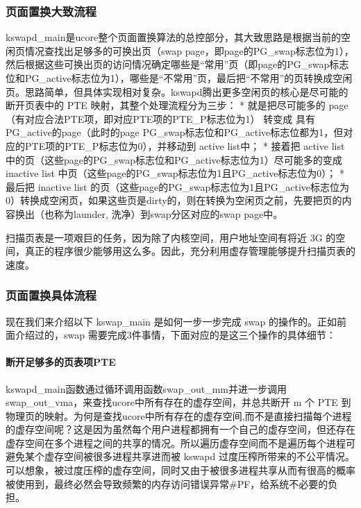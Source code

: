 \subsubsection{页面置换大致流程}\label{ux9875ux9762ux7f6eux6362ux5927ux81f4ux6d41ux7a0b}

kswapd\_main是ucore整个页面置换算法的总控部分，其大致思路是根据当前的空闲页情况查找出足够多的可换出页（swap
page，即page的PG\_swap标志位为1），然后根据这些可换出页的访问情况确定哪些是``常用''页（即page的PG\_swap标志位和PG\_active标志位为1），哪些是``不常用''页，最后把``不常用''的页转换成空闲页。思路简单，但具体实现相对复杂。kswapd腾出更多空闲页的核心是尽可能的断开页表中的
PTE 映射，其整个处理流程分为三步： * 就是把尽可能多的
page（有对应合法PTE项，即对应PTE项的PTE\_P标志位为1） 转变成
具有PG\_active的page（此时的page
PG\_swap标志位和PG\_active标志位都为1，但对应的PTE项的PTE\_P标志位为0），并移动到
active list中； * 接着把 active list
中的页（这些page的PG\_swap标志位和PG\_active标志位为1）尽可能多的变成
inactive list 中页（这些page的PG\_swap标志位为1且PG\_active标志位为0）；
* 最后把 inactive list
的页（这些page的PG\_swap标志位为1且PG\_active标志位为0）转换成空闲页，如果这些页是dirty的，则在转换为空闲页之前，先要把页的内容换出（也称为launder,
洗净）到swap分区对应的swap page中。

扫描页表是一项艰巨的任务，因为除了内核空间，用户地址空间有将近 3G
的空间，真正的程序很少能够用这么多。因此，充分利用虚存管理能够提升扫描页表的速度。

\subsubsection{页面置换具体流程}\label{ux9875ux9762ux7f6eux6362ux5177ux4f53ux6d41ux7a0b}

现在我们来介绍以下 kswap\_main 是如何一步一步完成 swap
的操作的。正如前面介绍过的，swap
需要完成3件事情，下面对应的是这三个操作的具体细节：

\paragraph{断开足够多的页表项PTE}\label{ux65adux5f00ux8db3ux591fux591aux7684ux9875ux8868ux9879pte}

kswapd\_main函数通过循环调用函数swap\_out\_mm并进一步调用swap\_out\_vma，来查找ucore中所有存在的虚存空间，并总共断开
m 个 PTE
到物理页的映射。为何是查找ucore中所有存在的虚存空间,而不是直接扫描每个进程的虚存空间呢？这是因为虽然每个用户进程都拥有一个自己的虚存空间，但还存在虚存空间在多个进程之间的共享的情况。所以遍历虚存空间而不是遍历每个进程可避免某个虚存空间被很多进程共享进而被
kswapd
过度压榨所带来的不公平情况。可以想象，被过度压榨的虚存空间，同时又由于被很多进程共享从而有很高的概率被使用到，最终必然会导致频繁的内存访问错误异常\#PF，给系统不必要的负担。

